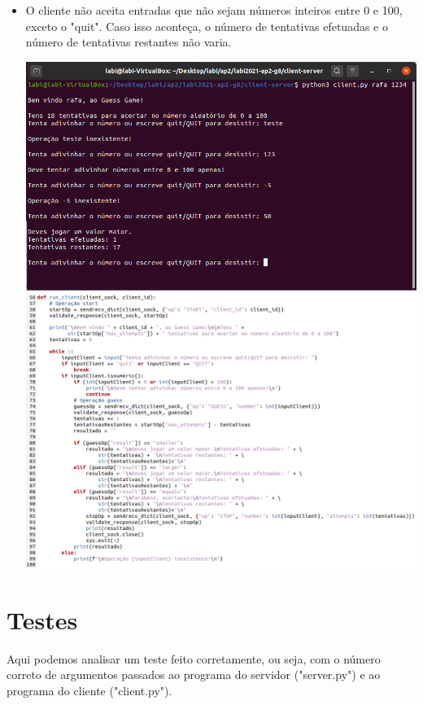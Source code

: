 \documentclass{report}
\begin{document}
\begin{itemize}
    \item O cliente não aceita entradas que não sejam números inteiros entre 0 e 100, exceto o "quit". Caso isso aconteça, o número de tentativas efetuadas e o número de tentativas restantes não varia.
        \begin{center}
            \includegraphics[scale = 0.58]{Imagens/cliente2.png}
            \includegraphics[scale = 0.5]{Imagens/cliente3.png}
        \end{center}
\end{itemize}


\chapter{Testes}
\label{chap.testes}
Aqui podemos analisar um teste feito corretamente, ou seja, com o número correto de argumentos passados ao programa do servidor ("server.py") e ao programa do cliente ("client.py").
\end{document}
